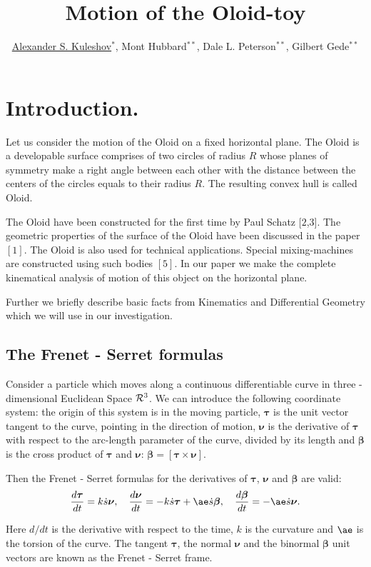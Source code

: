 \documentclass[10pt]{enoc2011}
\title{Motion of the Oloid-toy}
\author{\underline{Alexander S. Kuleshov}$^{\ast}$, Mont Hubbard$^{\ast\ast}$, Dale L. Peterson$^{\ast\ast}$, Gilbert Gede$^{\ast\ast}$}
\renewcommand{\vec}[1]{\boldsymbol{#1}}
\begin{document}

\section*{Introduction.}

Let us consider the motion of the Oloid on a fixed horizontal plane. The Oloid is a developable surface comprises of two circles of radius $R$ whose planes of symmetry make a right angle between each other with the distance between the centers of the circles equals to their radius $R$. The resulting convex hull is called Oloid.

The Oloid have been constructed for the first time by Paul Schatz $[2$,$3]$. The geometric properties of the surface of the Oloid have been discussed in the paper $[1]$. The Oloid is also used for technical applications. Special mixing-machines are constructed using such bodies $[5]$. In our paper we make the complete kinematical analysis of motion of this object on the horizontal plane.

Further we briefly describe basic facts from Kinematics and Differential Geometry which we will use in our investigation.

\subsection*{The Frenet - Serret formulas}
Consider a particle which moves along a continuous differentiable curve in three - dimensional Euclidean Space ${\cal R}^3$. We can introduce the following coordinate system: the origin of this system is in the moving particle, $\vec\tau$ is the unit vector tangent to the curve, pointing in the direction of motion, $\vec\nu$ is the derivative of $\vec\tau$ with respect to the arc-length parameter of the curve, divided by its length and $\vec\beta$ is the cross product of $\vec\tau$ and $\vec\nu$: $\vec\beta=\left[\vec\tau\times\vec\nu\right]$.

Then the Frenet - Serret formulas for the derivatives of $\vec\tau$, $\vec\nu$ and $\vec\beta$ are valid:
$$
\displaystyle\frac{d\vec\tau}{dt}=k\dot{s}\vec\nu,\quad
\displaystyle\frac{d\vec\nu}{dt}=-k\dot{s}\vec\tau+\ae\dot{s}\vec\beta, \quad
\displaystyle\frac{d\vec\beta}{dt}=-\ae\dot{s}\vec\nu.
$$

Here $d/dt$ is the derivative with respect to the time, $k$ is the curvature and $\ae$ is the torsion of the
curve. The tangent $\vec\tau$, the normal $\vec\nu$ and the binormal $\vec\beta$ unit vectors are known as the Frenet - Serret frame.
\end{document}
